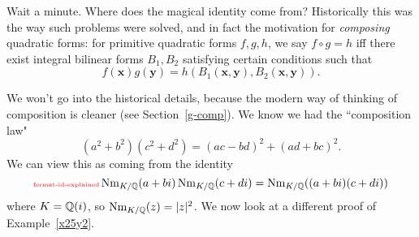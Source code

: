 Wait a minute. Where does the magical identity come from? Historically this was the way such problems were solved, and in fact the motivation for {\it composing} quadratic forms: for primitive quadratic forms $f,g,h$, we say $f\circ g=h$ iff there exist integral bilinear forms $B_1,B_2$ satisfying certain conditions such that
\[
f(\mathbf x)g(\mathbf y)=h(B_1(\mathbf x,\mathbf y),B_2(\mathbf x,\mathbf y)).
\]

We won't go into the historical details, because the modern way of thinking of composition is cleaner (see Section~\ref{g-comp}). We know we had the ``composition law"
\[
(a^2+b^2)(c^2+d^2)=(ac-bd)^2+(ad+bc)^2.
\]
We can view this as coming from the identity
\begin{equation}\llabel{fermat-id-explained}
\nm_{K/\Q}(a+bi)\nm_{K/\Q}(c+di)=\nm_{K/\Q}((a+bi)(c+di))
\end{equation}
where $K=\mathbb{Q}(i)$, so $\operatorname{Nm}_{K/\mathbb{Q}}(z)=|z|^2$. We now look at a different proof of Example~\ref{x25y2}.
